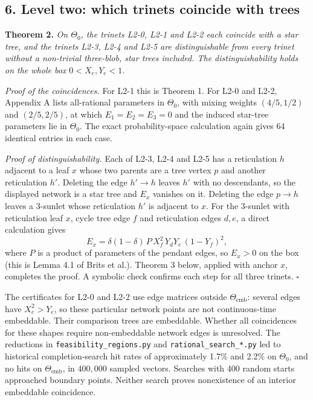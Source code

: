 \documentclass[
  11pt,
]{article}
\newcounter{none} %
\begin{document}
\subsection{6. Level two: which trinets coincide with
trees}\label{level-two-which-trinets-coincide-with-trees}

\textbf{Theorem 2.} \emph{On \(\Theta_0\), the trinets L2-0, L2-1 and
L2-2 each coincide with a star tree, and the trinets L2-3, L2-4 and L2-5
are distinguishable from every trinet without a non-trivial three-blob,
star trees included. The distinguishability holds on the whole box
\(0<X_e,Y_e<1\).}

\emph{Proof of the coincidences.} For L2-1 this is Theorem 1. For L2-0
and L2-2, Appendix A lists all-rational parameters in \(\Theta_0\), with
mixing weights \((4/5,1/2)\) and \((2/5,2/5)\), at which
\(E_1=E_2=E_3=0\) and the induced star-tree parameters lie in
\(\Theta_0\). The exact probability-space calculation again gives 64
identical entries in each case.

\emph{Proof of distinguishability.} Each of L2-3, L2-4 and L2-5 has a
reticulation \(h\) adjacent to a leaf \(x\) whose two parents are a tree
vertex \(p\) and another reticulation \(h'\). Deleting the edge
\(h'\to h\) leaves \(h'\) with no descendants, so the displayed network
is a star tree and \(E_x\) vanishes on it. Deleting the edge \(p\to h\)
leaves a 3-sunlet whose reticulation \(h'\) is adjacent to \(x\). For
the 3-sunlet with reticulation leaf \(x\), cycle tree edge \(f\) and
reticulation edges \(d,e\), a direct calculation gives
\[E_x = \delta(1-\delta)\,P\,X_f^2\,Y_dY_e\,(1-Y_f)^2,\] where \(P\) is
a product of parameters of the pendant edges, so \(E_x>0\) on the box
(this is Lemma 4.1 of Brits et al.). Theorem 3 below, applied with
anchor \(x\), completes the proof. A symbolic check confirms each step
for all three trinets. \(\square\)

The certificates for L2-0 and L2-2 use edge matrices outside
\(\Theta_{\mathrm{emb}}\): several edges have \(X_e^2 > Y_e\), so these
particular network points are not continuous-time embeddable. Their
comparison trees are embeddable. Whether all coincidences for these
shapes require non-embeddable network edges is unresolved. The
reductions in \texttt{feasibility\_regions.py} and
\texttt{rational\_search\_*.py} led to historical completion-search hit
rates of approximately 1.7\% and 2.2\% on \(\Theta_0\), and no hits on
\(\Theta_{\mathrm{emb}}\), in \(400{,}000\) sampled vectors. Searches
with 400 random starts approached boundary points. Neither search proves
nonexistence of an interior embeddable coincidence.
\end{document}
